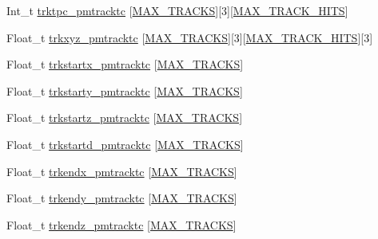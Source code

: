 \begin{DoxyCompactItemize}
\item 
Int\-\_\-t \hyperlink{classanatree_a4f72a32de56ea4acabed5f7af36de5fb}{trktpc\-\_\-pmtracktc} \mbox{[}\hyperlink{anatree__core__v09410002__orig_8h_a327fd4e796e4a0d78947524c96e4362e}{M\-A\-X\-\_\-\-T\-R\-A\-C\-K\-S}\mbox{]}\mbox{[}3\mbox{]}\mbox{[}\hyperlink{anatree__core__v09410002__orig_8h_ae75eb9050f16aa034339f05572523070}{M\-A\-X\-\_\-\-T\-R\-A\-C\-K\-\_\-\-H\-I\-T\-S}\mbox{]}
\item 
Float\-\_\-t \hyperlink{classanatree_ab16b7f14f5e6fca149d74f529415da6a}{trkxyz\-\_\-pmtracktc} \mbox{[}\hyperlink{anatree__core__v09410002__orig_8h_a327fd4e796e4a0d78947524c96e4362e}{M\-A\-X\-\_\-\-T\-R\-A\-C\-K\-S}\mbox{]}\mbox{[}3\mbox{]}\mbox{[}\hyperlink{anatree__core__v09410002__orig_8h_ae75eb9050f16aa034339f05572523070}{M\-A\-X\-\_\-\-T\-R\-A\-C\-K\-\_\-\-H\-I\-T\-S}\mbox{]}\mbox{[}3\mbox{]}
\item 
Float\-\_\-t \hyperlink{classanatree_aee4d66a2840c225fdf8f5e2852959cff}{trkstartx\-\_\-pmtracktc} \mbox{[}\hyperlink{anatree__core__v09410002__orig_8h_a327fd4e796e4a0d78947524c96e4362e}{M\-A\-X\-\_\-\-T\-R\-A\-C\-K\-S}\mbox{]}
\item 
Float\-\_\-t \hyperlink{classanatree_aa1fbfa3b3483659eea7d6c5c814e682b}{trkstarty\-\_\-pmtracktc} \mbox{[}\hyperlink{anatree__core__v09410002__orig_8h_a327fd4e796e4a0d78947524c96e4362e}{M\-A\-X\-\_\-\-T\-R\-A\-C\-K\-S}\mbox{]}
\item 
Float\-\_\-t \hyperlink{classanatree_a17bbd9a79203f3eb455b3a71b0fed64a}{trkstartz\-\_\-pmtracktc} \mbox{[}\hyperlink{anatree__core__v09410002__orig_8h_a327fd4e796e4a0d78947524c96e4362e}{M\-A\-X\-\_\-\-T\-R\-A\-C\-K\-S}\mbox{]}
\item 
Float\-\_\-t \hyperlink{classanatree_ae9e94d52eeab80c5aef6a3e53e88ba46}{trkstartd\-\_\-pmtracktc} \mbox{[}\hyperlink{anatree__core__v09410002__orig_8h_a327fd4e796e4a0d78947524c96e4362e}{M\-A\-X\-\_\-\-T\-R\-A\-C\-K\-S}\mbox{]}
\item 
Float\-\_\-t \hyperlink{classanatree_a1af511a02182ee259a0721daa054ad56}{trkendx\-\_\-pmtracktc} \mbox{[}\hyperlink{anatree__core__v09410002__orig_8h_a327fd4e796e4a0d78947524c96e4362e}{M\-A\-X\-\_\-\-T\-R\-A\-C\-K\-S}\mbox{]}
\item 
Float\-\_\-t \hyperlink{classanatree_a0329b01453907face0bc6374ed6480fc}{trkendy\-\_\-pmtracktc} \mbox{[}\hyperlink{anatree__core__v09410002__orig_8h_a327fd4e796e4a0d78947524c96e4362e}{M\-A\-X\-\_\-\-T\-R\-A\-C\-K\-S}\mbox{]}
\item 
Float\-\_\-t \hyperlink{classanatree_a59616b2a2011fe1f367235a0ad23e634}{trkendz\-\_\-pmtracktc} \mbox{[}\hyperlink{anatree__core__v09410002__orig_8h_a327fd4e796e4a0d78947524c96e4362e}{M\-A\-X\-\_\-\-T\-R\-A\-C\-K\-S}\mbox{]}

\end{DoxyCompactItemize}

